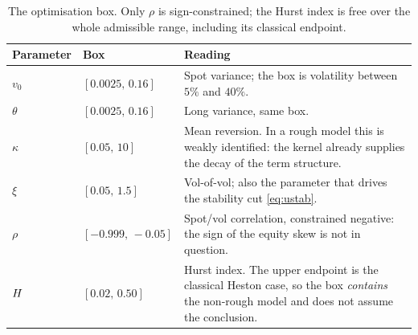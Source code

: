 \begin{table}[H]
\centering
\small
\begin{tabularx}{\textwidth}{llX}
\toprule
Parameter & Box & Reading \\
\midrule
$v_{0}$     & $[0.0025,\,0.16]$   & Spot variance; the box is volatility between $5\%$ and $40\%$. \\
$\theta$    & $[0.0025,\,0.16]$   & Long variance, same box. \\
$\kappa$    & $[0.05,\,10]$       & Mean reversion. In a rough model this is weakly identified: the kernel already supplies the decay of the term structure. \\
$\xi$       & $[0.05,\,1.5]$      & Vol-of-vol; also the parameter that drives the stability cut \eqref{eq:ustab}. \\
$\rho$      & $[-0.999,\,-0.05]$  & Spot/vol correlation, constrained negative: the sign of the equity skew is not in question. \\
$H$    & $[0.02,\,0.50]$     & Hurst index. The upper endpoint is the classical Heston case, so the box \emph{contains} the non-rough model and does not assume the conclusion. \\
\bottomrule
\end{tabularx}
\caption[The optimisation box]{The optimisation box. Only $\rho$ is sign-constrained; the Hurst index is free over the whole admissible range, including its classical endpoint.}
\label{tab:rhbounds}
\end{table}


